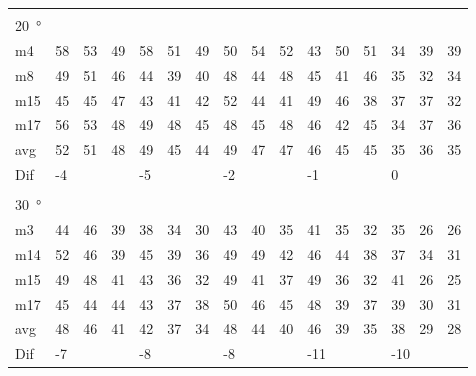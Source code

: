 \begin{table}[H]
\begin{tabular}{l|l|l|l|l|l|l|l|l|l|l|l|l|lll}
 \multicolumn{16}{l}{ } \\                             
\SI{20}{\degree}   & \multicolumn{3}{l|}{} & \multicolumn{3}{l|}{} & \multicolumn{3}{l|}{} & \multicolumn{3}{l|}{} & \multicolumn{3}{l}{}   \\  \hline
m4    & 58     & 53     &  49    &   58   &  51    &  49    &   50   &   54    &  52    &  43     &   50   &  51    & \multicolumn{1}{l|}{34} & \multicolumn{1}{l|}{39} & 39 \\
m8    &  49    &  51   &   46   &   44   &   39   &  40    &   48   &   44    &   48   &    45   &    41  &   46   & \multicolumn{1}{l|}{35} & \multicolumn{1}{l|}{32} & 34 \\
m15  &  45    & 45     &   47   &  43    &  41    &  42    & 52     &    44   &   41   &   49    &   46   &   38   & \multicolumn{1}{l|}{37} & \multicolumn{1}{l|}{37} & 32 \\
m17  &  56    & 53     &  48    &  49    & 48     &  45    &  48    &   45    &    48  &   46    &   42   & 45     & \multicolumn{1}{l|}{34} & \multicolumn{1}{l|}{37} & 36 \\ \hline
avg & 52     & 51     &  48    &  49    &  45    &  44    &  49    &   47    & 47     &    46   &   45   &  45    & \multicolumn{1}{l|}{35} & \multicolumn{1}{l|}{36}  & 35  \\ \hline  
Dif & \multicolumn{3}{l|}{-4} & \multicolumn{3}{l|}{-5} & \multicolumn{3}{l|}{-2} & \multicolumn{3}{l|}{-1} & \multicolumn{3}{l}{0} \\ 
 \multicolumn{16}{l}{ } \\                             
\SI{30}{\degree}   & \multicolumn{3}{l|}{} & \multicolumn{3}{l|}{} & \multicolumn{3}{l|}{} & \multicolumn{3}{l|}{} & \multicolumn{3}{l}{}   \\  \hline
m3    & 44     &  46    &  39    &  38    &  34    &  30    &  43    &   40    &   35   &   41    &  35    &   32   & \multicolumn{1}{l|}{35} & \multicolumn{1}{l|}{26} &26  \\
m14  & 52     &  46    &  39    &  45    &   39   &  36    &  49    &  49     &  42    &   46    &   44   &   38   & \multicolumn{1}{l|}{37} & \multicolumn{1}{l|}{34} & 31 \\
m15  &  49    &  48    &  41    &   43   &   36   &   32   &   49   &  41     & 37     &    49   &   36   &   32   & \multicolumn{1}{l|}{41} & \multicolumn{1}{l|}{26} & 25 \\
m17  & 45     &  44    &  44    &  43    &  37    &    38  &   50   &   46    &  45    &  48     &  39    &   37   & \multicolumn{1}{l|}{39} & \multicolumn{1}{l|}{30} &  31\\ \hline
avg &  48    & 46     &  41    &  42    &  37    &  34    &  48    &   44    &  40    &   46    &   39   &  35    & \multicolumn{1}{l|}{38} & \multicolumn{1}{l|}{29}  & 28 \\ \hline  
Dif & \multicolumn{3}{l|}{-7} & \multicolumn{3}{l|}{-8} & \multicolumn{3}{l|}{-8} & \multicolumn{3}{l|}{-11} & \multicolumn{3}{l}{-10}                                
\end{tabular}
\end{table}



